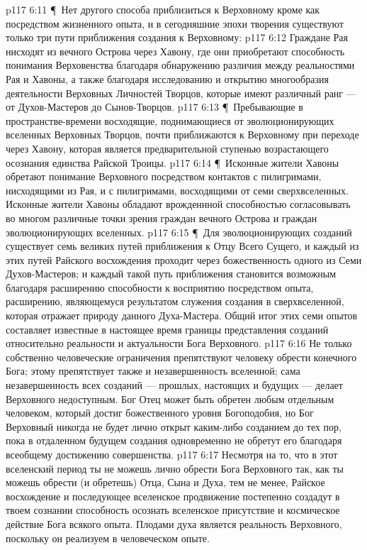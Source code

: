 \vs p117 6:11 \P\ Нет другого способа приблизиться к Верховному кроме как посредством жизненного опыта, и в сегодняшние эпохи творения существуют только три пути приближения создания к Верховному:
\vs p117 6:12 \bibnobreakspace Граждане Рая нисходят из вечного Острова через Хавону, где они приобретают способность понимания Верховенства благодаря обнаружению различия между реальностями Рая и Хавоны, а также благодаря исследованию и открытию многообразия деятельности Верховных Личностей Творцов, которые имеют различный ранг --- от Духов\hyp{}Мастеров до Сынов\hyp{}Творцов.
\vs p117 6:13 \P\ \bibnobreakspace Пребывающие в пространстве\hyp{}времени восходящие, поднимающиеся от эволюционирующих вселенных Верховных Творцов, почти приближаются к Верховному при переходе через Хавону, которая является предварительной ступенью возрастающего осознания единства Райской Троицы.
\vs p117 6:14 \P\ \bibnobreakspace Исконные жители Хавоны обретают понимание Верховного посредством контактов с пилигримами, нисходящими из Рая, и с пилигримами, восходящими от семи сверхвселенных. Исконные жители Хавоны обладают врожденнной способностью согласовывать во многом различные точки зрения граждан вечного Острова и граждан эволюционирующих вселенных.
\vs p117 6:15 \P\ Для эволюционирующих созданий существует семь великих путей приближения к Отцу Всего Сущего, и каждый из этих путей Райского восхождения проходит через божественность одного из Семи Духов\hyp{}Мастеров; и каждый такой путь приближения становится возможным благодаря расширению способности к восприятию посредством опыта, расширению, являющемуся результатом служения создания в сверхвселенной, которая отражает природу данного Духа\hyp{}Мастера. Общий итог этих семи опытов составляет известные в настоящее время границы представления созданий относительно реальности и актуальности Бога Верховного.
\vs p117 6:16 Не только собственно человеческие ограничения препятствуют человеку обрести конечного Бога; этому препятствует также и незавершенность вселенной; сама незавершенность всех созданий --- прошлых, настоящих и будущих --- делает Верховного недоступным. Бог Отец может быть обретен любым отдельным человеком, который достиг божественного уровня Богоподобия, но Бог Верховный никогда не будет лично открыт каким\hyp{}либо  созданием до тех пор, пока в отдаленном будущем  создания одновременно не обретут его благодаря всеобщему достижению совершенства.
\vs p117 6:17 Несмотря на то, что в этот вселенский период ты не можешь лично обрести Бога Верховного так, как ты можешь обрести (и обретешь) Отца, Сына и Духа, тем не менее, Райское восхождение и последующее вселенское продвижение постепенно создадут в твоем сознании способность осознать вселенское присутствие и космическое действие Бога всякого опыта. Плодами духа является реальность Верховного, поскольку он реализуем в человеческом опыте.
